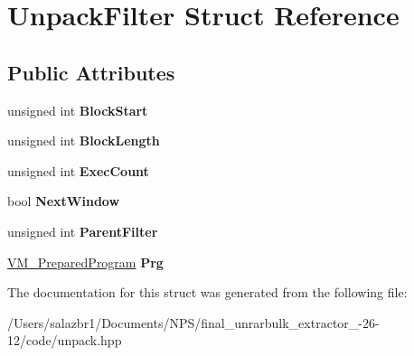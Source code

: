 \hypertarget{struct_unpack_filter}{\section{Unpack\-Filter Struct Reference}
\label{struct_unpack_filter}
}
\subsection*{Public Attributes}
\begin{DoxyCompactItemize}
\item 
\hypertarget{struct_unpack_filter_a368b53188fbd6301c5f9f8c6b7c102eb}{unsigned int {\bfseries Block\-Start}}\label{struct_unpack_filter_a368b53188fbd6301c5f9f8c6b7c102eb}

\item 
\hypertarget{struct_unpack_filter_a06ab8d48d3d41aa1bf4f87c4a4ad9968}{unsigned int {\bfseries Block\-Length}}\label{struct_unpack_filter_a06ab8d48d3d41aa1bf4f87c4a4ad9968}

\item 
\hypertarget{struct_unpack_filter_a839710e5c94b13f658b3489e10cf0362}{unsigned int {\bfseries Exec\-Count}}\label{struct_unpack_filter_a839710e5c94b13f658b3489e10cf0362}

\item 
\hypertarget{struct_unpack_filter_a10816e5c9e32126fac0b39707d7b8acd}{bool {\bfseries Next\-Window}}\label{struct_unpack_filter_a10816e5c9e32126fac0b39707d7b8acd}

\item 
\hypertarget{struct_unpack_filter_a070d0aa66673287f04c23e8eaaaeb0e2}{unsigned int {\bfseries Parent\-Filter}}\label{struct_unpack_filter_a070d0aa66673287f04c23e8eaaaeb0e2}

\item 
\hypertarget{struct_unpack_filter_ad74355f58bb17a9d052e668cad46489a}{\hyperlink{struct_v_m___prepared_program}{V\-M\-\_\-\-Prepared\-Program} {\bfseries Prg}}\label{struct_unpack_filter_ad74355f58bb17a9d052e668cad46489a}

\end{DoxyCompactItemize}


The documentation for this struct was generated from the following file\-:\begin{DoxyCompactItemize}
\item 
/\-Users/salazbr1/\-Documents/\-N\-P\-S/final\-\_\-unrarbulk\-\_\-extractor\-\_-\/26-\/12/code/unpack.\-hpp\end{DoxyCompactItemize}
